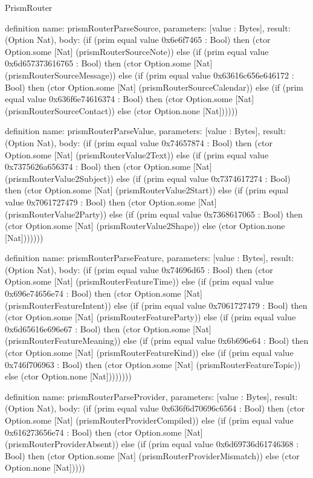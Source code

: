 \begin{lexlean}{PrismRouter}
\begin{semanticmodule}
definition{
  name: prismRouterParseSource,
  parameters: [value : Bytes],
  result: (Option Nat),
  body: (if (prim equal value 0x6e6f7465 : Bool) then (ctor Option.some [Nat] (prismRouterSourceNote)) else (if (prim equal value 0x6d657373616765 : Bool) then (ctor Option.some [Nat] (prismRouterSourceMessage)) else (if (prim equal value 0x63616c656e646172 : Bool) then (ctor Option.some [Nat] (prismRouterSourceCalendar)) else (if (prim equal value 0x636f6e74616374 : Bool) then (ctor Option.some [Nat] (prismRouterSourceContact)) else (ctor Option.none [Nat])))))
}

definition{
  name: prismRouterParseValue,
  parameters: [value : Bytes],
  result: (Option Nat),
  body: (if (prim equal value 0x74657874 : Bool) then (ctor Option.some [Nat] (prismRouterValue2Text)) else (if (prim equal value 0x7375626a656374 : Bool) then (ctor Option.some [Nat] (prismRouterValue2Subject)) else (if (prim equal value 0x7374617274 : Bool) then (ctor Option.some [Nat] (prismRouterValue2Start)) else (if (prim equal value 0x7061727479 : Bool) then (ctor Option.some [Nat] (prismRouterValue2Party)) else (if (prim equal value 0x7368617065 : Bool) then (ctor Option.some [Nat] (prismRouterValue2Shape)) else (ctor Option.none [Nat]))))))
}

definition{
  name: prismRouterParseFeature,
  parameters: [value : Bytes],
  result: (Option Nat),
  body: (if (prim equal value 0x74696d65 : Bool) then (ctor Option.some [Nat] (prismRouterFeatureTime)) else (if (prim equal value 0x696e74656e74 : Bool) then (ctor Option.some [Nat] (prismRouterFeatureIntent)) else (if (prim equal value 0x7061727479 : Bool) then (ctor Option.some [Nat] (prismRouterFeatureParty)) else (if (prim equal value 0x6d65616e696e67 : Bool) then (ctor Option.some [Nat] (prismRouterFeatureMeaning)) else (if (prim equal value 0x6b696e64 : Bool) then (ctor Option.some [Nat] (prismRouterFeatureKind)) else (if (prim equal value 0x746f706963 : Bool) then (ctor Option.some [Nat] (prismRouterFeatureTopic)) else (ctor Option.none [Nat])))))))
}

definition{
  name: prismRouterParseProvider,
  parameters: [value : Bytes],
  result: (Option Nat),
  body: (if (prim equal value 0x636f6d70696c6564 : Bool) then (ctor Option.some [Nat] (prismRouterProviderCompiled)) else (if (prim equal value 0x616273656e74 : Bool) then (ctor Option.some [Nat] (prismRouterProviderAbsent)) else (if (prim equal value 0x6d69736d61746368 : Bool) then (ctor Option.some [Nat] (prismRouterProviderMismatch)) else (ctor Option.none [Nat]))))
}


\end{semanticmodule}
\end{lexlean}
